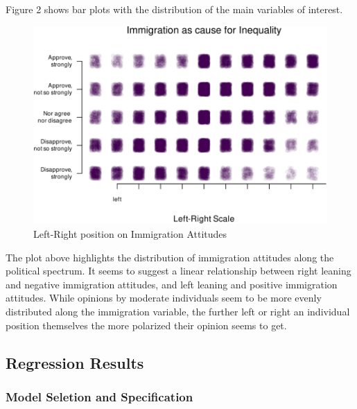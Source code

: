 \documentclass[
  11pt,
]{article}
\begin{document}
\vspace{0.4cm}

Figure 2 shows bar plots with the distribution of the main variables of
interest.

\begin{figure}
\centering
\includegraphics{AQM-paper_files/figure-latex/lrplot-1.pdf}
\caption{Left-Right position on Immigration Attitudes}
\end{figure}

\vspace{0.4cm}

The plot above highlights the distribution of immigration attitudes
along the political spectrum. It seems to suggest a linear relationship
between right leaning and negative immigration attitudes, and left
leaning and positive immigration attitudes. While opinions by moderate
individuals seem to be more evenly distributed along the immigration
variable, the further left or right an individual position themselves
the more polarized their opinion seems to get.

\hypertarget{regression-results}{%
\subsection{\texorpdfstring{\textbf{Regression
Results}}{Regression Results}}\label{regression-results}}

\hypertarget{model-seletion-and-specification}{%
\subsubsection{Model Seletion and
Specification}\label{model-seletion-and-specification}}
\end{document}
